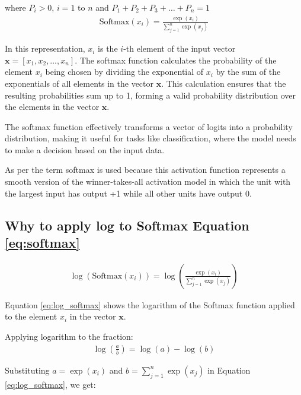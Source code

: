 where \(P_i > 0\), \(i=1\) to \(n\) and \(P_1 + P_2 + P_3 + \ldots + P_n = 1\) \\


\begin{align}
    \text{Softmax}(x_i) = \frac{{\exp(x_i)}}{{\sum_{j=1}^n \exp(x_j)}} \label{eq:softmax}
\end{align}


In this representation, \(x_i\) is the \(i\)-th element of the input vector \(\mathbf{x} = [x_1, x_2, \ldots, x_n]\). The softmax function calculates the probability of the element \(x_i\) being chosen by dividing the exponential of \(x_i\) by the sum of the exponentials of all elements in the vector \(\mathbf{x}\). This calculation ensures that the resulting probabilities sum up to 1, forming a valid probability distribution over the elements in the vector \(\mathbf{x}\).

The softmax function effectively transforms a vector of logits into a probability distribution, making it useful for tasks like classification, where the model needs to make a decision based on the input data.

As per \parencite{Book-Bishop-Neural} the term softmax is used because this activation function represents a smooth version of the winner-takes-all activation model in which the unit with the largest input has output +1 while all other units have output 0.

\clearpage

\subsection{Why to apply log to Softmax Equation \eqref{eq:softmax} } \label{sec:Logsoft}

 

\begin{align}
    \log(\text{Softmax}(x_i)) = \log\left(\frac{{\exp(x_i)}}{{\sum_{j=1}^n \exp(x_j)}}\right) \label{eq:log_softmax}
\end{align}

Equation \eqref{eq:log_softmax} shows the logarithm of the Softmax function applied to the element \(x_i\) in the vector \(\mathbf{x}\). 

Applying logarithm to the fraction: 
\begin{align}
    \log\left(\frac{a}{b}\right) = \log(a) - \log(b)
\end{align}

Substituting \(a = \exp(x_i)\) and \(b = \sum_{j=1}^n \exp(x_j)\) in Equation \eqref{eq:log_softmax}, we get:

